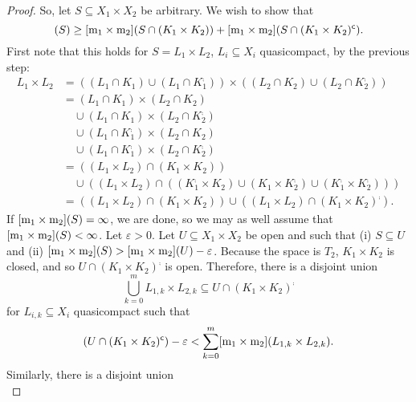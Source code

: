\begin{thm}
\begin{proof}
So, let $S\subseteq X_1\times X_2$ be arbitrary.  We wish to show that
\begin{equation}
[\meas _1\times \meas _2](S)\geq [\meas _1\times \meas _2](S\cap (K_1\times K_2))+[\meas _1\times \meas _2](S\cap (K_1\times K_2)^{\comp}).
\end{equation}
First note that this holds for $S=L_1\times L_2$, $L_i\subseteq X_i$ quasicompact, by the previous step:
\begin{equation}
\begin{split}
L_1\times L_2 & =\left( (L_1\cap K_1)\cup (L_1\cap K_1^{\comp})\right) \times \left( (L_2\cap K_2)\cup ( L_2\cap K_2^{\comp})\right) \\
& =(L_1\cap K_1)\times (L_2\cap K_2) \\
& \quad \cup (L_1\cap K_1)\times (L_2\cap K_2^{\comp}) \\
& \quad \cup (L_1\cap K_1^{\comp})\times (L_2\cap K_2) \\
& \quad \cup (L_1\cap K_1^{\comp})\times (L_2\cap K_2^{\comp}) \\
& =\left( (L_1\times L_2)\cap (K_1\times K_2)\right) \\
& \quad \cup \left( (L_1\times L_2)\cap \left( (K_1^{\comp}\times K_2)\cup (K_1\times K_2^{\comp})\cup (K_1^{\comp}\times K_2^{\comp})\right) \right) \\
& =\left( (L_1\times L_2)\cap (K_1\times K_2)\right) \cup \left( (L_1\times L_2)\cap (K_1\times K_2)^{\comp}\right) .
\end{split}
\end{equation}
If $[\mathrm{m} _1\times \mathrm{m} _2](S)=\infty$, we are done, so we may as well assume that $[\mathrm{m} _1\times \mathrm{m} _2](S)<\infty$.  Let $\varepsilon >0$.  Let $U\subseteq X_1\times X_2$ be open and such that (i) $S\subseteq U$ and (ii) $[\mathrm{m} _1\times \mathrm{m} _2](S)>[\mathrm{m} _1\times \mathrm{m} _2](U)-\varepsilon$.  Because the space is $T_2$, $K_1\times K_2$ is closed, and so $U\cap (K_1\times K_2)^{\comp}$ is open.  Therefore, there is a disjoint union
\begin{equation}
\bigcup _{k=0}^mL_{1,k}\times L_{2,k}\subseteq U\cap (K_1\times K_2)^{\comp}
\end{equation}
for $L_{i,k}\subseteq X_i$ quasicompact such that
\begin{equation}
[\meas _1\times \meas _2](U\cap (K_1\times K_2)^{\comp})-\varepsilon <\sum _{k=0}^m[\meas _1\times \meas _2](L_{1,k}\times L_{2,k}).
\end{equation}
Similarly, there is a disjoint union
\begin{equation}

\end{equation}
\end{proof}
\end{thm}

